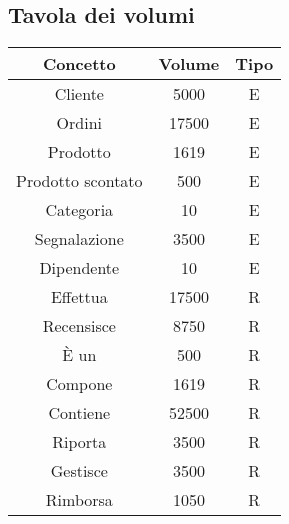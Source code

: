 \subsection{Tavola dei volumi}
\begin{center}
\begin{tabular}{ |c|c|c|} 
\hline
Concetto & Volume & Tipo \\
\hline
\multirow{2}{6em}{Cliente} & \multirow{2}{2em}{5000} & \multirow{2}{12em}{E}\\
 & &\\
 \hline
\multirow{2}{6em}{Ordini} & \multirow{2}{2em}{17500} & \multirow{2}{12em}{E}\\
 & &\\
\hline
\multirow{2}{6em}{Prodotto} & \multirow{2}{2em}{1619} & \multirow{2}{12em}{E}\\
 & &\\
\hline 
\multirow{2}{6em}{Prodotto scontato} & \multirow{2}{2em}{500} & \multirow{2}{12em}{E}\\
 & &\\
\hline 
\multirow{2}{6em}{Categoria} & \multirow{2}{2em}{10} & \multirow{2}{12em}{E}\\
 & &\\
\hline
\multirow{2}{6em}{Segnalazione} & \multirow{2}{2em}{3500} & \multirow{2}{12em}{E}\\
 & &\\
 \hline
\multirow{2}{6em}{Dipendente} & \multirow{2}{2em}{10} & \multirow{2}{12em}{E}\\
 & &\\
\hline
\multirow{2}{6em}{Effettua} & \multirow{2}{2em}{17500} & \multirow{2}{12em}{R}\\
 & &\\
\hline
\multirow{2}{6em}{Recensisce} & \multirow{2}{2em}{8750} & \multirow{2}{12em}{R}\\
 & &\\
\hline
\multirow{2}{6em}{È un} & \multirow{2}{2em}{500} & \multirow{2}{12em}{R}\\
 & &\\
\hline
\multirow{2}{6em}{Compone} & \multirow{2}{2em}{1619} & \multirow{2}{12em}{R}\\
 & &\\
\hline
\multirow{2}{6em}{Contiene} & \multirow{2}{2em}{52500} & \multirow{2}{12em}{R}\\
 & &\\
\hline
\multirow{2}{6em}{Riporta} & \multirow{2}{2em}{3500} & \multirow{2}{12em}{R}\\
 & &\\
\hline
\multirow{2}{6em}{Gestisce} & \multirow{2}{2em}{3500} & \multirow{2}{12em}{R}\\
 & &\\
\hline
\multirow{2}{6em}{Rimborsa} & \multirow{2}{2em}{1050} & \multirow{2}{12em}{R}\\
 & &\\
\hline
\end{tabular}
\end{center}